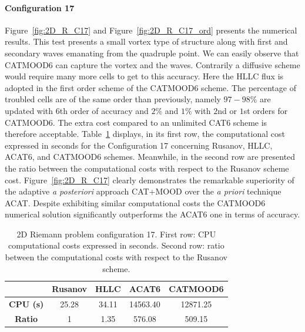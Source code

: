 \paragraph{Configuration 17}
Figure~\ref{fig:2D_R_C17} and 
Figure~\ref{fig:2D_R_C17_ord} presents the numerical results.
This test presents a small vortex type of structure along with first and secondary waves emanating from the quadruple point.
We can easily observe that CATMOOD6 can capture the vortex and the waves. Contrarily a diffusive scheme would require many more cells to get to this accuracy.
Here the HLLC flux is adopted in the first order scheme of the CATMOOD6 scheme.
The percentage of troubled cells are of the same order than previously, namely $97-98\%$ are updated with $6$th order of accuracy and $2\%$ and $1\%$ with $2$nd or $1$st orders for CATMOOD6. 
The extra cost compared to an unlimited CAT6 scheme is therefore acceptable. 
Table~\ref{CPU:2D_Riemann17} displays, in its first row, the computational cost expressed in seconds for the Configuration 17 concerning Rusanov, HLLC, ACAT6, and CATMOOD6 schemes. Meanwhile, in the second row are presented the ratio between the computational costs with respect to the Rusanov scheme cost. 
Figure~\ref{fig:2D_R_C17} clearly demonstrates the remarkable superiority of the adaptive \textit{a posteriori} approach CAT+MOOD over the \textit{a priori} technique ACAT. 
Despite exhibiting similar computational costs the CATMOOD6 numerical solution significantly outperforms the ACAT6 one in terms of accuracy. 
\begin{table}[!ht]
    \centering
    \numerikNine
    \begin{tabular}{|c||c| c| c| c|}
    \hline 
    & \textbf{Rusanov } & \textbf{HLLC} &  \textbf{ACAT6}   &  \textbf{CATMOOD6} \\
    \hline 
    \textbf{CPU (s)} & 25.28 & 34.11   & 14563.40  & 12871.25   \\ \hline
    \textbf{Ratio} & 1 & 1.35  & 576.08 &  509.15 \\
    \hline
    \end{tabular} 
    \caption{ 2D Riemann problem configuration 17. First row: CPU computational costs expressed in seconds. Second row: ratio between the computational costs with respect to the Rusanov scheme.}
    \label{CPU:2D_Riemann17}
\end{table}


%
%
\clearpage
